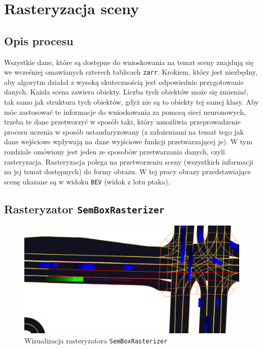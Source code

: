 \chapter{Rasteryzacja sceny}
\thispagestyle{chapterBeginStyle}
\section{Opis procesu}

Wszystkie dane, które są dostępne do wnioskowania na temat sceny znajdują się we wcześniej omawianych czterech tablicach \texttt{zarr}. Krokiem, który jest niezbędny, aby algorytm działał z wysoką skutecznością jest odpowiednie przygotowanie danych. Każda scena zawiera obiekty. Liczba tych obiektów może się zmieniać, tak samo jak struktura tych obiektów, gdyż nie są to obiekty tej samej klasy. Aby móc zastosować te informacje do wnioskowania za pomocą sieci neuronowych, trzeba te dane przetworzyć w sposób taki, który umożliwia przeprowadzenie procesu uczenia w sposób ustandaryzowany (z założeniami na temat tego jak dane wejściowe wpływają na dane wyjściowe funkcji przetwarzającej je). W tym rozdziale omówiony jest jeden ze sposobów przetwarzania danych, czyli rasteryzacja. Rasteryzacja polega na przetworzeniu sceny (wszystkich informacji na jej temat dostępnych) do formy obrazu. W tej pracy obrazy przedstawiające scenę ukazane są w widoku \texttt{BEV} (widok z lotu ptaka).

\section{Rasteryzator \texttt{SemBoxRasterizer}}

\begin{figure}[htbp]
    \centering
    \includegraphics[width=\linewidth]{raster_l5kit.png}
    \caption{Wizualizacja rasteryzatora \texttt{SemBoxRasterizer}}
\end{figure}

